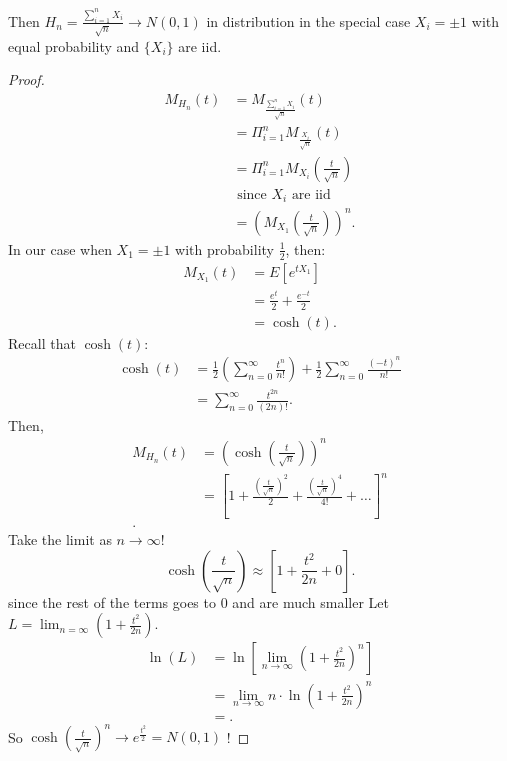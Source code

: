\documentclass[a4paper]{article}
\begin{document}
\begin{lemma}
  Then $H_n = \frac{\sum_{i=1}^{n} X_i}{\sqrt{n} } \to N(0,1)$ in distribution in the special case $X_i = \pm 1$ with equal probability and  $\{X_i\} $ are iid.
  \begin{proof}
    \begin{align*}
      M_{H_n}(t) &= M_{\frac{\sum_{i=1}^{n} X_i}{\sqrt{n} }} (t) \\
                 &= \Pi_{i=1}^{n} M_{\frac{X_i}{\sqrt{n} }} (t) \\
                 &=  \Pi_{i=1}^{n} M_{X_i} (\frac{t}{\sqrt{n}}) \\
                 &\text{ since $X_i$ are iid} \\
                 &= (M_{X_1}(\frac{t}{\sqrt{n}}))^{n}
    .\end{align*}
    In our case when $X_1=\pm 1$ with probability  $\frac{1}{2}$, then:
    \begin{align*}
      M_{X_1}(t) &= E[e^{tX_1}] \\
                 &= \frac{e^{t}}{2} + \frac{e^{-t}}{2} \\
                 &= \cosh(t)
    .\end{align*}
    Recall that $\cosh(t)$:
    \begin{align*}
      \cosh(t) &= \frac{1}{2} \left( \sum_{n=0}^{\infty} \frac{t^{n}}{n!} \right)  + \frac{1}{2} \sum_{n=0}^{\infty}\frac{(-t)^{n}}{n!} \\
               &= \sum_{n=0}^{\infty} \frac{t^{2n}}{(2n)!} 
    .\end{align*} 
    Then,
    \begin{align*}
      M_{H_n}(t) &= (\cosh(\frac{t}{\sqrt{n} }))^{n} \\
                 &= [1+\frac{\left( \frac{t}{\sqrt{n} } \right)^{2} }{2 } + \frac{\left( \frac{t}{\sqrt{n} } \right)^{4} }{4!} + \ldots]^{n} \\
    .\end{align*}
    Take the limit as $n \to \infty$!
     \[
       \cosh(\frac{t}{\sqrt{n}}) \approx [1 + \frac{t^{2}}{2n} + 0] 
    .\] since the rest of the terms goes to 0 and are much smaller
    Let $L = \lim_{n=\infty} (1+ \frac{t^2}{2n})$.
    \begin{align*}
      \ln(L) &= \ln[\lim_{n\to \infty} (1+\frac{t^2}{2n})^{n}] \\
             &= \lim_{n \to \infty} n \cdot \ln(1+\frac{t^2}{2n})^{n} \\
             &=  
    .\end{align*}
    So $\cosh(\frac{t}{\sqrt{n} })^{n} \to e^{\frac{t^2}{2}} = N(0,1)$ !
  \end{proof}
\end{lemma}
\end{document}
